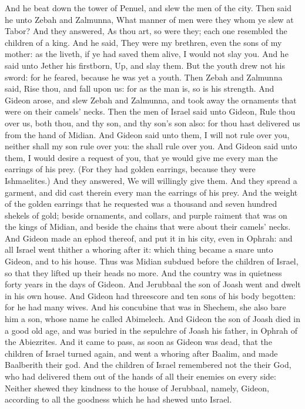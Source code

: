 \begin{biblechapter}
\verse And he beat down the tower of Penuel, and slew the men of the city.
\verse Then said he unto Zebah and Zalmunna, What manner of men were they whom ye slew at Tabor? And they answered, As thou art, so were they; each one resembled the children of a king.
\verse And he said, They were my brethren, even the sons of my mother: as the \LORD liveth, if ye had saved them alive, I would not slay you.
\verse And he said unto Jether his firstborn, Up, and slay them. But the youth drew not his sword: for he feared, because he was yet a youth.
\verse Then Zebah and Zalmunna said, Rise thou, and fall upon us: for as the man is, so is his strength. And Gideon arose, and slew Zebah and Zalmunna, and took away the ornaments that were on their camels' necks.
 Then the men of Israel said unto Gideon, Rule thou over us, both thou, and thy son, and thy son's son also: for thou hast delivered us from the hand of Midian.
\verse And Gideon said unto them, I will not rule over you, neither shall my son rule over you: the \LORD shall rule over you.
\verse And Gideon said unto them, I would desire a request of you, that ye would give me every man the earrings of his prey. (For they had golden earrings, because they were Ishmaelites.)
\verse And they answered, We will willingly give them. And they spread a garment, and did cast therein every man the earrings of his prey.
\verse And the weight of the golden earrings that he requested was a thousand and seven hundred shekels of gold; beside ornaments, and collars, and purple raiment that was on the kings of Midian, and beside the chains that were about their camels' necks.
\verse And Gideon made an ephod thereof, and put it in his city, even in Ophrah: and all Israel went thither a whoring after it: which thing became a snare unto Gideon, and to his house.
 Thus was Midian subdued before the children of Israel, so that they lifted up their heads no more. And the country was in quietness forty years in the days of Gideon.
\verse And Jerubbaal the son of Joash went and dwelt in his own house.
\verse And Gideon had threescore and ten sons of his body begotten: for he had many wives.
\verse And his concubine that was in Shechem, she also bare him a son, whose name he called Abimelech.
\verse And Gideon the son of Joash died in a good old age, and was buried in the sepulchre of Joash his father, in Ophrah of the Abiezrites.
\verse And it came to pass, as soon as Gideon was dead, that the children of Israel turned again, and went a whoring after Baalim, and made Baalberith their god.
\verse And the children of Israel remembered not the \LORD their God, who had delivered them out of the hands of all their enemies on every side:
\verse Neither shewed they kindness to the house of Jerubbaal, namely, Gideon, according to all the goodness which he had shewed unto Israel.
\end{biblechapter}

